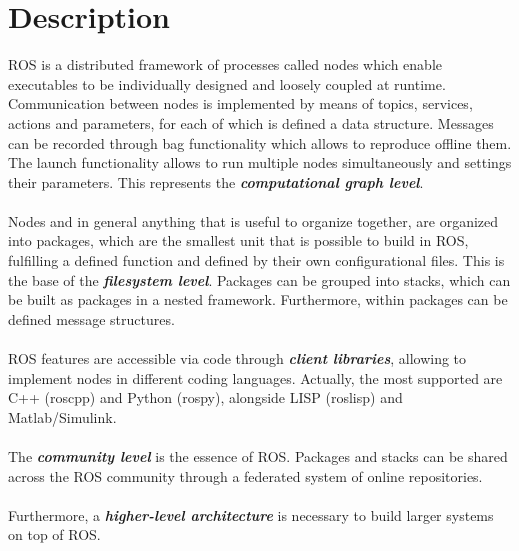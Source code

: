     \section{Description} 
        ROS is a distributed framework of processes called nodes which enable executables to be individually designed and loosely coupled at runtime. 
        Communication between nodes is implemented by means of topics, services, actions and parameters, for each of which is defined a data structure. 
        Messages can be recorded through bag functionality which allows to reproduce offline them. The launch functionality allows to run multiple nodes 
        simultaneously and settings their parameters. This represents the \textbf{\emph{computational graph level}}. \\
        \\
        Nodes and in general anything that is useful to organize together, are organized into packages, which are the smallest unit that is possible to 
        build in ROS, fulfilling a defined function and defined by their own configurational files. This is the base of the \textbf{\emph{filesystem level}}. 
        Packages can be grouped into stacks, which can be built as packages in a nested framework. Furthermore, within packages can be defined message structures. \\
        \\
        ROS features are accessible via code through \textbf{\emph{client libraries}}, allowing to implement nodes in different coding languages. Actually, 
        the most supported are C++ (roscpp) and Python (rospy), alongside LISP (roslisp) and Matlab/Simulink. \\
        \\
        The \textbf{\emph{community level}} is the essence of ROS. Packages and stacks can be shared across the ROS community through a federated system 
        of online repositories. \\
        \\
        Furthermore, a \textbf{\emph{higher-level architecture}} is necessary to build larger systems on top of ROS.


            